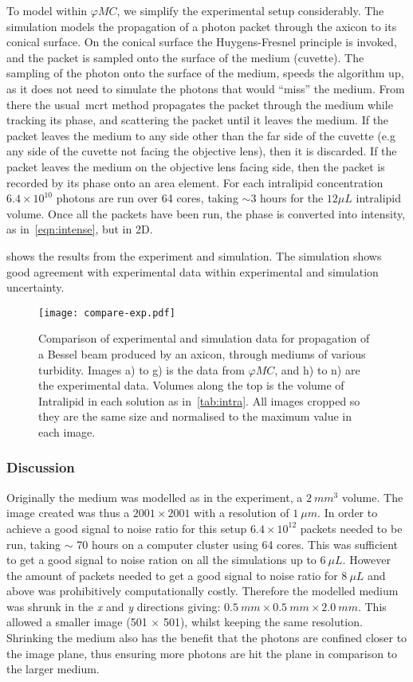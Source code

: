 To model within $\varphi MC$, we simplify the experimental setup considerably.
The simulation models the propagation of a photon packet through the axicon to its conical surface. 
On the conical surface the Huygens-Fresnel principle is invoked, and the packet is sampled onto the surface of the medium (cuvette).
The sampling of the photon onto the surface of the medium, speeds the algorithm up, as it does not need to simulate the photons that would ``miss'' the medium.
From there the usual~\gls*{mcrt} method propagates the packet through the medium while tracking its phase, and scattering the packet until it leaves the medium.
If the packet leaves the medium to any side other than the far side of the cuvette (e.g any side of the cuvette not facing the objective lens), then it is discarded.
If the packet leaves the medium on the objective lens facing side, then the packet is recorded by its phase onto an area element.
For each intralipid concentration $6.4\times10^{10}$ photons are run over 64 cores, taking $\sim 3$ hours for the $12\mu L$ intralipid volume.
Once all the packets have been run, the phase is converted into intensity, as in~\cref{eqn:intense}, but in 2D.

 shows the results from the experiment and simulation. The simulation shows good agreement with experimental data within experimental and simulation uncertainty.

\begin{figure}[!ht]
\centering
\texttt{[image: compare-exp.pdf]}
\caption{Comparison of experimental and simulation data for propagation of a Bessel beam produced by an axicon, through mediums of various turbidity. Images a) to g) is the data from $\varphi MC$, and h) to n) are the experimental data. Volumes along the top is the volume of Intralipid in each solution as in~\cref{tab:intra}. All images cropped so they are the same size and normalised to the maximum value in each image.}
\label{fig:compareexpbessel}
\end{figure}

\subsubsection*{Discussion}

Originally the medium was modelled as in the experiment, a $2~mm^3$ volume.
The image created was thus a $2001 \times 2001$ with a resolution of $1~\mu m$.
In order to achieve a good signal to noise ratio for this setup $6.4\times10^{12}$ packets needed to be run, taking $\sim$ 70 hours on a computer cluster using 64 cores.
This was sufficient to get a good signal to noise ration on all the simulations up to $6~\mu L$.
However the amount of packets needed to get a good signal to noise ratio for $8~\mu L$ and above was prohibitively computationally costly.
Therefore the modelled medium was shrunk in the \textit{x} and \textit{y} directions giving: $0.5~mm \times 0.5~mm \times 2.0~mm$.
This allowed a smaller image (501 $\times$ 501), whilst keeping the same resolution.
Shrinking the medium also has the benefit that the photons are confined closer to the image plane, thus ensuring more photons are hit the plane in comparison to the larger medium. 

